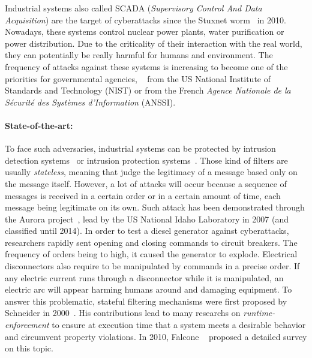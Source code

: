 Industrial systems also called SCADA (\emph{Supervisory Control And
Data Acquisition}) are the target of cyberattacks since the Stuxnet
worm~\cite{Lan11} in 2010.
Nowadays, these systems control nuclear power plants, water purification or
power distribution.
Due to the criticality of their interaction with the real world, they can
potentially be really harmful for humans and environment.
The frequency of attacks against these systems is increasing to become one of the
priorities for governmental agencies, \eg~\cite{SFS11} from the US
National Institute of Standards and Technology (NIST) or
\cite{ANSSI12_guide_securite_industrielle_en} from the French {\em Agence
Nationale de la Sécurité des Systèmes d'Information} (ANSSI).

\paragraph{State-of-the-art:} To face such adversaries, industrial systems can
be protected by intrusion detection
systems~\cite{StoneGate13,Pax99,Suricata,Snort} or intrusion protection
systems~\cite{DESIRE10,StoneGate11,rWeb13,DZNetwork14}.
Those kind of filters are usually {\em stateless}, meaning that judge the 
legitimacy of a message based only on the message itself.
However, a lot of attacks will occur because a sequence of messages is received
in a certain order or in a certain amount of time, each message being legitimate
on its own.
Such attack has been demonstrated through the Aurora project~\cite{Aurora}, lead
by the US National Idaho Laboratory in 2007 (and classified until 2014).
In order to test a diesel generator against cyberattacks, researchers rapidly 
sent opening and closing commands to circuit breakers.
The frequency of orders being to high, it caused the generator to explode.
Electrical disconnectors also require to be manipulated by commands in a precise
order.
If any electric current runs through a disconnector while it is manipulated, an
electric arc will appear harming humans around and damaging equipment.
To answer this problematic, stateful filtering mechanisms were first proposed by
Schneider in 2000~\cite{Sch00}.
His contributions lead to many researchs on {\em runtime-enforcement} to ensure
at execution time that a system meets a desirable behavior and circumvent
property violations.
In 2010, Falcone \etal~\cite{FFM10} proposed a detailed survey on this topic.

